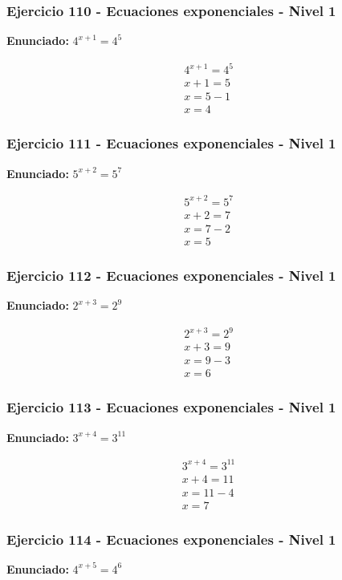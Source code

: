 \documentclass[12pt,a4paper]{article}
\begin{document}
\subsubsection*{Ejercicio 110 - Ecuaciones exponenciales - Nivel 1}
\textbf{Enunciado:} \(4^{x+1}=4^{5}\)

\[
\begin{aligned}
4^{x+1}=4^{5}\\
x+1=5\\
x=5-1\\
\boxed{x=4}
\end{aligned}
\]


\subsubsection*{Ejercicio 111 - Ecuaciones exponenciales - Nivel 1}
\textbf{Enunciado:} \(5^{x+2}=5^{7}\)

\[
\begin{aligned}
5^{x+2}=5^{7}\\
x+2=7\\
x=7-2\\
\boxed{x=5}
\end{aligned}
\]


\subsubsection*{Ejercicio 112 - Ecuaciones exponenciales - Nivel 1}
\textbf{Enunciado:} \(2^{x+3}=2^{9}\)

\[
\begin{aligned}
2^{x+3}=2^{9}\\
x+3=9\\
x=9-3\\
\boxed{x=6}
\end{aligned}
\]


\subsubsection*{Ejercicio 113 - Ecuaciones exponenciales - Nivel 1}
\textbf{Enunciado:} \(3^{x+4}=3^{11}\)

\[
\begin{aligned}
3^{x+4}=3^{11}\\
x+4=11\\
x=11-4\\
\boxed{x=7}
\end{aligned}
\]


\subsubsection*{Ejercicio 114 - Ecuaciones exponenciales - Nivel 1}
\textbf{Enunciado:} \(4^{x+5}=4^{6}\)
\end{document}

